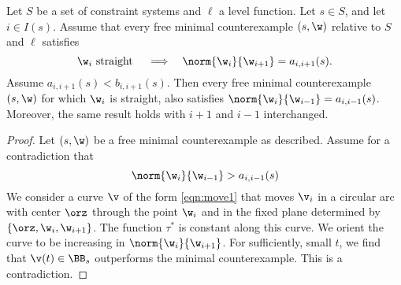 \begin{lemma} \label{lemma:nux}
  Let $S$ be a set of constraint systems and $\ell$ a level
  function. Let $s\in S$, and let $i\in I(s)$.  Assume that every
  free minimal counterexample $(s,\w)$ relative to $S$ and $\ell$
  satisfies
\[
\w_i \text{ straight } \quad
\Longrightarrow\quad \norm{\w_i}{\w_{i+1}}=a_{i,i+1}(s).
\]
Assume $a_{i,i+1}(s)<b_{i,i+1}(s)$.
Then every free minimal counterexample $(s,\w)$
for which $\w_i$ is straight, also satisfies $\norm{\w_i}{\w_{i-1}}=a_{i,i-1}(s)$.
Moreover, the same result holds with $i+1$ and $i-1$ interchanged.
\end{lemma}

\begin{proof}
Let $(s,\w)$ be a free minimal counterexample as described.
Assume for a contradiction that 
\[
\norm{\w_i}{\w_{i-1}}>a_{i,i-1}(s)
\]
We consider a curve $\v$ of the form \eqref{eqn:move1} that moves $\v_i$
in a circular arc with center $\orz$ through the point $\w_i$ and in
the fixed plane determined by $\{\orz,\w_i,\w_{i+1}\}$.  The function $\tau^*$ is
constant along this curve.  We orient the curve to be increasing
in $\norm{\w_i}{\w_{i+1}}$.  For sufficiently, small $t$, we find that
$\v(t)\in\BB_s$ outperforms the minimal counterexample. This is a contradiction.
\end{proof}


